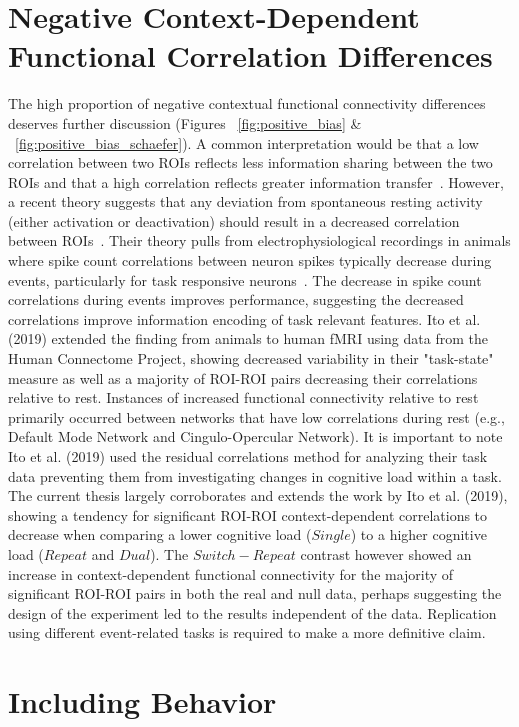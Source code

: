 \documentclass[phd,figures,tables,ackpage,abstractpage,publicabstractpage]{uithesis}
\begin{document}
\section{Negative Context-Dependent Functional Correlation Differences}

The high proportion of negative contextual functional connectivity differences deserves
further discussion (Figures ~\ref{fig:positive_bias} \& ~\ref{fig:positive_bias_schaefer}).
A common interpretation would be that a low correlation between two ROIs reflects less information
sharing between the two ROIs and that a high correlation
reflects greater information transfer~\cite{Gonzalez-Castillo2018}.
However, a recent theory suggests that any deviation from spontaneous resting activity
(either activation or deactivation) should result in a decreased correlation between ROIs~\cite{Ito2019}.
Their theory pulls from electrophysiological recordings in animals where
spike count correlations between neuron spikes typically decrease during events,
particularly for task responsive neurons~\cite{Ruff2014,Cohen2009}.
The decrease in spike count correlations during events improves performance,
suggesting the decreased correlations improve information encoding of task
relevant features.
Ito et al. (2019) extended the finding from animals to human fMRI
using data from the Human Connectome Project, showing decreased variability
in their "task-state" measure as well as a majority of ROI-ROI pairs decreasing their
correlations relative to rest.
Instances of increased functional connectivity relative to rest primarily occurred between
networks that have low correlations during rest (e.g., Default Mode Network and Cingulo-Opercular Network).
It is important to note Ito et al. (2019) used the residual correlations method for analyzing
their task data preventing them from investigating changes in cognitive load within a task.
The current thesis largely corroborates and extends the work by Ito et al. (2019),
showing a tendency for significant ROI-ROI context-dependent correlations to decrease
when comparing a lower cognitive load ($Single$) to a higher cognitive load ($Repeat$ and $Dual$).
The $Switch - Repeat$ contrast however showed an increase in context-dependent functional connectivity
for the majority of significant ROI-ROI pairs in both the real and null data, perhaps suggesting the
design of the experiment led to the results independent of the data.
Replication using different event-related tasks is required to make a more definitive
claim.

\section{Including Behavior}
\end{document}
